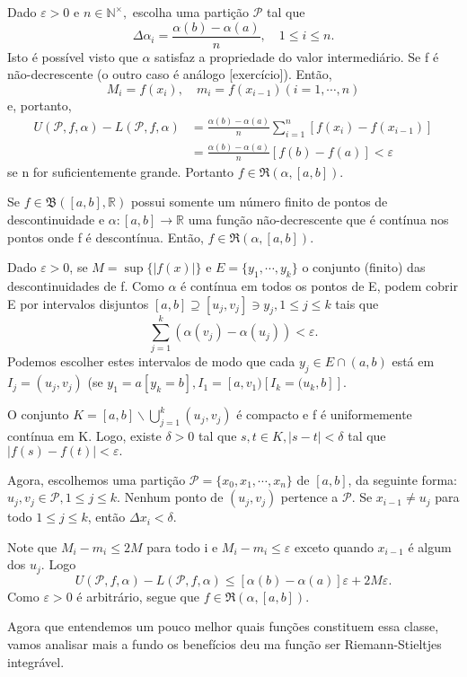 \documentclass[Analysis/analysis_notes.tex]{subfiles}
\begin{document}
\begin{proof*}
	Dado \(\varepsilon >0\) e \(n\in \mathbb{N}^{\times},\) escolha uma parti\c cão \(\mathcal{P}\) tal que
	\[
		\Delta \alpha_{i} = \frac{\alpha (b) - \alpha (a)}{n},\quad 1\leq i\leq n.
	\]
	Isto é possível visto que \(\alpha \) satisfaz a propriedade do valor intermediário. Se
	f é não-decrescente (o outro caso é análogo [exercício]). Então,
	\[
		M_{i}=f(x_{i}),\quad m_{i}=f(x_{i-1}) (i=1, \cdots, n)
	\]
	e, portanto,
	\begin{align*}
		U(\mathcal{P}, f, \alpha ) - L(\mathcal{P}, f, \alpha ) & = \frac{\alpha (b) - \alpha (a)}{n}\sum\limits_{i=1}^{n}[f(x_{i})-f(x_{i-1})] \\
		                                                        & = \frac{\alpha (b) - \alpha (a)}{n}[f(b)-f(a)] < \varepsilon
	\end{align*}
	se n for suficientemente grande. Portanto \(f\in \mathfrak{R}(\alpha, [a,b])\). \qedsymbol
\end{proof*}
\begin{theorem*}
	Se \(f\in \mathfrak{B}([a, b], \mathbb{R})\) possui somente um número finito de pontos de
	descontinuidade e \(\alpha :[a, b]\rightarrow \mathbb{R}\) uma fun\c cão não-decrescente que é
	contínua nos pontos onde f é descontínua. Então, \(f\in \mathfrak{R}(\alpha , [a, b]).\)
\end{theorem*}
\begin{proof*}
	Dado \(\varepsilon >0\), se \(M=\sup\{|f(x)|\}\) e \(E = \{y_{1}, \cdots, y_{k}\}\) o
	conjunto (finito) das descontinuidades de f. Como \(\alpha \) é contínua em todos os
	pontos de E, podem cobrir E por intervalos disjuntos \([a, b]\supseteq{[u_{j}, v_{j}]}\ni y_{j}, 1\leq j\leq k\)  tais que
	\[
		\sum\limits_{j=1}^{k}(\alpha (v_{j})-\alpha (u_{j})) < \varepsilon .
	\]
	Podemos escolher estes intervalos de modo que cada \(y_{j}\in E\cap{(a, b)}\) está em \(I_{j}=(u_{j}, v_{j})\)
	(se \(y_{1}=a[y_{k}=b], I_{1}=[a, v_{1})[I_{k}=(u_{k}, b]].\)

	O conjunto \(K=[a, b]\backslash{\bigcup_{j=1}^{k}{(u_{j},v_{j})}}\) é compacto e f é uniformemente
	contínua em K. Logo, existe \(\delta >0\) tal que \(s, t\in K, |s-t| < \delta \) tal que
	\(|f(s) - f(t)| < \varepsilon .\)

	Agora, escolhemos uma parti\c cão \(\mathcal{P} = \{x_{0}, x_{1}, \cdots, x_{n}\}\) de \([a, b]\), da
	seguinte forma: \(u_{j}, v_{j}\in \mathcal{P}, 1\leq j\leq k.\) Nenhum ponto
	de \((u_{j}, v_{j})\) pertence a \(\mathcal{P}\). Se \(x_{i-1}\neq u_{j}\) para todo \(1\leq j\leq k\), então
	\(\Delta x_{i} < \delta.\)

	Note que \(M_{i}-m_{i}\leq 2M\) para todo i e \(M_{i} - m_{i}\leq \varepsilon \) exceto quando
	\(x_{i-1}\) é algum dos \(u_{j}.\) Logo
	\[
		U(\mathcal{P}, f, \alpha ) - L(\mathcal{P}, f, \alpha )\leq [\alpha (b) - \alpha (a)]\varepsilon  + 2M\varepsilon.
	\]
	Como \(\varepsilon >0\) é arbitrário, segue que \(f\in \mathfrak{R}(\alpha , [a, b])\). \qedsymbol
\end{proof*}
Agora que entendemos um pouco melhor quais fun\c cões constituem essa classe, vamos
analisar mais a fundo os benefícios deu ma fun\c cão ser Riemann-Stieltjes integrável.
\end{document}
